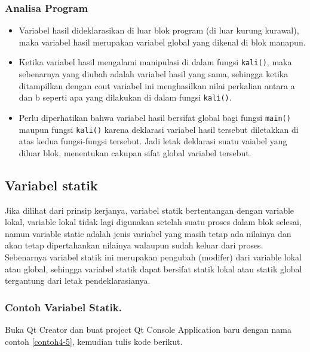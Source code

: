\subsubsection*{Analisa Program}

\begin{itemize}

\item
 Variabel hasil dideklarasikan di luar blok program (di luar kurung
 kurawal), maka variabel hasil merupakan variabel global yang dikenal
 di blok manapun.
\item
 Ketika variabel hasil mengalami manipulasi di dalam fungsi
 \texttt{kali()}, maka sebenarnya yang diubah adalah variabel hasil
 yang sama, sehingga ketika ditampilkan dengan cout variabel ini
 menghasilkan nilai perkalian antara a dan b seperti apa yang dilakukan
 di dalam fungsi \texttt{kali()}.
\item
 Perlu diperhatikan bahwa variabel hasil bersifat global bagi fungsi
 \texttt{main()} maupun fungsi \texttt{kali()} karena deklarasi
 variabel hasil tersebut diletakkan di atas kedua fungsi-fungsi
 tersebut. Jadi letak deklarasi suatu vaiabel yang diluar blok,
 menentukan cakupan sifat global variabel tersebut.
\end{itemize}

\subsection{Variabel statik}\label{variabel-statik}

Jika dilihat dari prinsip kerjanya, variabel statik bertentangan dengan
variable lokal, variable lokal tidak lagi digunakan setelah suatu proses
dalam blok selesai, namun variable static adalah jenis variabel yang
masih tetap ada nilainya dan akan tetap dipertahankan nilainya walaupun
sudah keluar dari proses. Sebenarnya variabel statik ini merupakan
pengubah (modifer) dari variable lokal atau global, sehingga variabel
statik dapat bersifat statik lokal atau statik global tergantung dari
letak pendeklarasianya.

\subsubsection*{Contoh Variabel Statik.}

Buka Qt Creator dan buat project Qt Console Application baru dengan nama
contoh \ref{contoh4-5}, kemudian tulis kode berikut.



